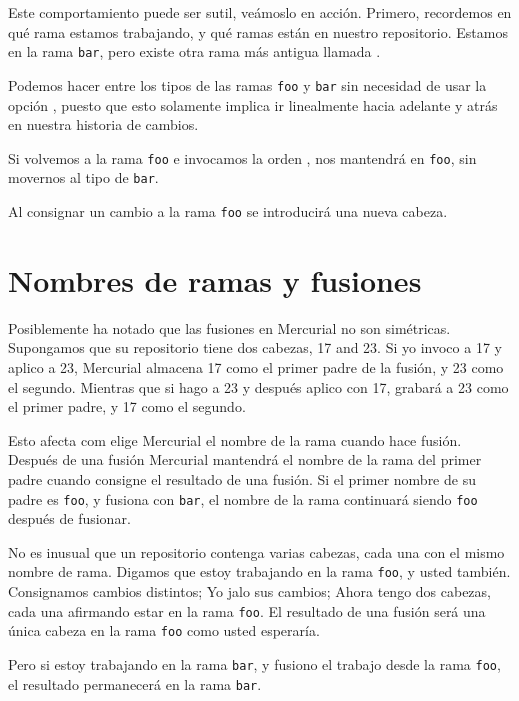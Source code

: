 Este comportamiento puede ser sutil, veámoslo en acción.  Primero,
recordemos en qué rama estamos trabajando, y qué ramas están en
nuestro repositorio.
Estamos en la rama \texttt{bar}, pero existe otra rama más antigua
llamada .

Podemos hacer  entre los tipos de las ramas \texttt{foo}
y \texttt{bar} sin necesidad de usar la opción ,
puesto que esto solamente implica ir linealmente hacia adelante y
atrás en nuestra historia de cambios.

Si volvemos a la rama \texttt{foo} e invocamos la orden ,
nos mantendrá en \texttt{foo}, sin movernos al tipo de \texttt{bar}.

Al consignar un cambio a la rama \texttt{foo} se introducirá una nueva
cabeza.

\section{Nombres de ramas y fusiones}

Posiblemente ha notado que las fusiones en Mercurial no son simétricas.
Supongamos que su repositorio tiene dos cabezas, 17 and 23.  Si yo invoco
 a 17 y aplico  a 23, Mercurial almacena 17
como el primer padre de la fusión, y 23 como el segundo. Mientras que
si hago  a 23 y después aplico  con 17,
grabará a 23 como el primer padre, y 17 como el segundo.

Esto afecta com elige Mercurial el nombre de la rama cuando hace
fusión.  Después de una fusión Mercurial mantendrá el nombre de la
rama del primer padre cuando consigne el resultado de una fusión.  Si
el primer nombre de su padre es \texttt{foo}, y fusiona con
\texttt{bar}, el nombre de la rama continuará siendo \texttt{foo}
después de fusionar.

No es inusual que un repositorio contenga varias cabezas, cada una con
el mismo nombre de rama.  Digamos que estoy trabajando en la rama
\texttt{foo}, y usted también.  Consignamos cambios distintos; Yo jalo
sus cambios; Ahora tengo dos cabezas, cada una afirmando estar en la
rama \texttt{foo}.  El resultado de una fusión será una única cabeza
en la rama \texttt{foo} como usted esperaría.

Pero si estoy trabajando en la rama \texttt{bar}, y fusiono el trabajo
desde la rama \texttt{foo}, el resultado permanecerá en la rama
\texttt{bar}.

